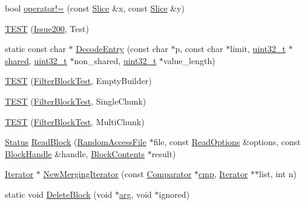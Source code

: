 \begin{DoxyCompactItemize}
bool \hyperlink{namespaceleveldb_a6592a36834e5a52b66cc8357c7ef806b}{operator!=} (const \hyperlink{classleveldb_1_1_slice}{Slice} \&x, const \hyperlink{classleveldb_1_1_slice}{Slice} \&y)
\item 
\hyperlink{namespaceleveldb_a5052c77c33dedcb489acd0c29f6bfcb3}{T\-E\-S\-T} (\hyperlink{classleveldb_1_1_issue200}{Issue200}, Test)
\item 
static const char $\ast$ \hyperlink{namespaceleveldb_a924f4e20853c0748f98e8f93f6a93ab9}{Decode\-Entry} (const char $\ast$p, const char $\ast$limit, \hyperlink{stdint_8h_a435d1572bf3f880d55459d9805097f62}{uint32\-\_\-t} $\ast$\hyperlink{db__bench_8cc_af670cad03774a4316fb28a8634d33a56}{shared}, \hyperlink{stdint_8h_a435d1572bf3f880d55459d9805097f62}{uint32\-\_\-t} $\ast$non\-\_\-shared, \hyperlink{stdint_8h_a435d1572bf3f880d55459d9805097f62}{uint32\-\_\-t} $\ast$value\-\_\-length)
\item 
\hyperlink{namespaceleveldb_a8360ab2a7a18ca54cbb3e99d80440248}{T\-E\-S\-T} (\hyperlink{classleveldb_1_1_filter_block_test}{Filter\-Block\-Test}, Empty\-Builder)
\item 
\hyperlink{namespaceleveldb_a9eb56f9aedd874d7e877b5b0e3737854}{T\-E\-S\-T} (\hyperlink{classleveldb_1_1_filter_block_test}{Filter\-Block\-Test}, Single\-Chunk)
\item 
\hyperlink{namespaceleveldb_aa7a90a751773a0c3e22a0fe0c1b67c14}{T\-E\-S\-T} (\hyperlink{classleveldb_1_1_filter_block_test}{Filter\-Block\-Test}, Multi\-Chunk)
\item 
\hyperlink{classleveldb_1_1_status}{Status} \hyperlink{namespaceleveldb_a63198fc7656081fd62695dade629790b}{Read\-Block} (\hyperlink{classleveldb_1_1_random_access_file}{Random\-Access\-File} $\ast$file, const \hyperlink{structleveldb_1_1_read_options}{Read\-Options} \&options, const \hyperlink{classleveldb_1_1_block_handle}{Block\-Handle} \&handle, \hyperlink{structleveldb_1_1_block_contents}{Block\-Contents} $\ast$result)
\item 
\hyperlink{classleveldb_1_1_iterator}{Iterator} $\ast$ \hyperlink{namespaceleveldb_ab8bdbd2babe772234f8dee1bc4f44eb5}{New\-Merging\-Iterator} (const \hyperlink{structleveldb_1_1_comparator}{Comparator} $\ast$\hyperlink{table__test_8cc_a87863e435922f0910ca8db43f02a6c0b}{cmp}, \hyperlink{classleveldb_1_1_iterator}{Iterator} $\ast$$\ast$list, int n)
\item 
static void \hyperlink{namespaceleveldb_aae44808dd6055cdc2672d3afd8a9dfa2}{Delete\-Block} (void $\ast$\hyperlink{env__posix_8cc_a9ce2ec4812a92cb6ab39f6e81e9173a9}{arg}, void $\ast$ignored)
$$
\end{DoxyCompactItemize}
